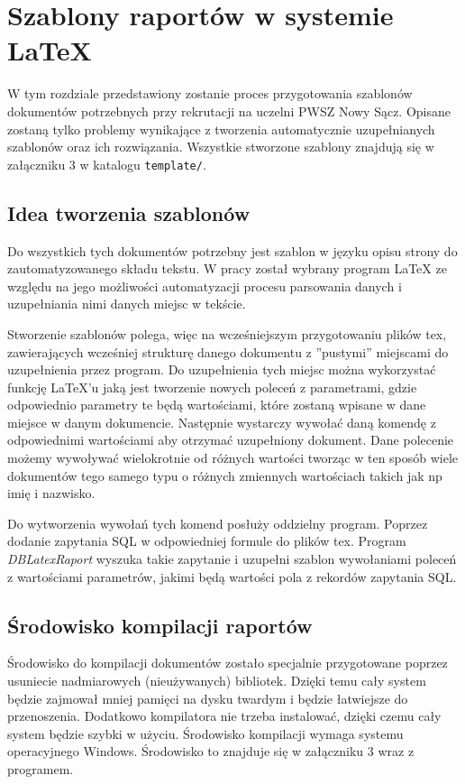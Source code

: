 \chapter{Szablony raportów w systemie LaTeX}
\label{ch:szablonyraportowwsystemielatex}

W tym rozdziale przedstawiony zostanie proces przygotowania szablonów dokumentów potrzebnych przy rekrutacji na uczelni PWSZ Nowy Sącz. Opisane zostaną tylko problemy wynikające z tworzenia automatycznie uzupełnianych szablonów oraz ich rozwiązania. Wszystkie stworzone szablony znajdują się w załączniku 3 w katalogu \texttt{template/}.

\section{Idea tworzenia szablonów}

Do wszystkich tych dokumentów potrzebny jest szablon w języku opisu strony do zautomatyzowanego składu tekstu. W pracy został wybrany program LaTeX ze względu na jego możliwości automatyzacji procesu parsowania danych i uzupełniania nimi danych miejsc w tekście.

Stworzenie szablonów polega, więc na wcześniejszym przygotowaniu plików tex, zawierających wcześniej strukturę danego dokumentu z ''pustymi''  miejscami do uzupełnienia przez program. Do uzupełnienia tych miejsc można wykorzystać funkcję LaTeX'u jaką jest tworzenie nowych poleceń z parametrami, gdzie odpowiednio parametry te będą wartościami, które zostaną wpisane w dane miejsce w danym dokumencie. Następnie wystarczy wywołać daną komendę z odpowiednimi wartościami aby otrzymać uzupełniony dokument. Dane polecenie możemy wywoływać wielokrotnie od różnych wartości tworząc w ten sposób wiele dokumentów tego samego typu o różnych zmiennych wartościach takich jak np imię i nazwisko. 

 Do wytworzenia wywołań tych komend posłuży oddzielny program. Poprzez dodanie zapytania SQL w odpowiedniej formule do plików tex. Program \emph{DBLatexRaport} wyszuka takie zapytanie i uzupełni szablon wywołaniami poleceń z wartościami parametrów, jakimi będą wartości pola z rekordów zapytania SQL. 

\section{Środowisko kompilacji raportów}

Środowisko do kompilacji dokumentów zostało specjalnie przygotowane poprzez usuniecie nadmiarowych (nieużywanych) bibliotek. Dzięki temu cały system będzie zajmował mniej pamięci na dysku twardym i będzie łatwiejsze do przenoszenia. Dodatkowo kompilatora nie trzeba instalować, dzięki czemu cały system będzie szybki w użyciu. Środowisko kompilacji wymaga systemu operacyjnego Windows. Środowisko to znajduje się w załączniku 3 wraz z programem.


